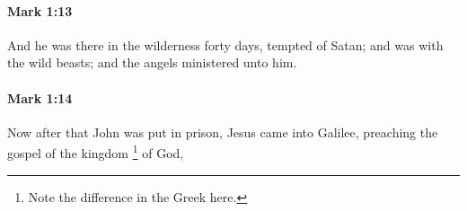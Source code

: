 		\paragraph{Mark 1:13} %
			\label{MARK-1-13}

			And he was there in the wilderness forty days, tempted of Satan; and was with the wild beasts; and the angels ministered unto him.

			\begin{framed}
			\scriptsize
				\begin{compactdesc}
					\item[SBLG]  \hyperref[PEIRAZO]{} 
				\end{compactdesc}
			\end{framed}

		\paragraph{Mark 1:14} %
			\label{MARK-1-14}

			Now after that John was put in prison, Jesus came into Galilee, preaching the gospel of the kingdom%
				\footnote{%
					Note the difference in the Greek here.
					}
			of God,

